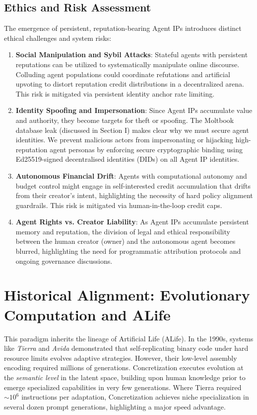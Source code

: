 \documentclass[10pt,journal,compsoc]{IEEEtran}
\begin{document}
\subsection{Ethics and Risk Assessment}
The emergence of persistent, reputation-bearing Agent IPs introduces distinct ethical challenges and system risks:
\begin{enumerate}
    \item \textbf{Social Manipulation and Sybil Attacks}: Stateful agents with persistent reputations can be utilized to systematically manipulate online discourse. Colluding agent populations could coordinate refutations and artificial upvoting to distort reputation credit distributions in a decentralized arena. This risk is mitigated via persistent identity anchor rate limiting.
    \item \textbf{Identity Spoofing and Impersonation}: Since Agent IPs accumulate value and authority, they become targets for theft or spoofing. The Moltbook database leak (discussed in Section I) makes clear why we must secure agent identities. We prevent malicious actors from impersonating or hijacking high-reputation agent personas by enforcing secure cryptographic binding using Ed25519-signed decentralised identities (DIDs) on all Agent IP identities.
    \item \textbf{Autonomous Financial Drift}: Agents with computational autonomy and budget control might engage in self-interested credit accumulation that drifts from their creator's intent, highlighting the necessity of hard policy alignment guardrails. This risk is mitigated via human-in-the-loop credit caps.
    \item \textbf{Agent Rights vs. Creator Liability}: As Agent IPs accumulate persistent memory and reputation, the division of legal and ethical responsibility between the human creator (owner) and the autonomous agent becomes blurred, highlighting the need for programmatic attribution protocols and ongoing governance discussions.
\end{enumerate}

\section{Historical Alignment: Evolutionary Computation and ALife}
This paradigm inherits the lineage of Artificial Life (ALife). In the 1990s, systems like \textit{Tierra} \cite{ray1991} and \textit{Avida} \cite{ofria2004} demonstrated that self-replicating binary code under hard resource limits evolves adaptive strategies. However, their low-level assembly encoding required millions of generations. Concretization executes evolution at the \textit{semantic level} in the latent space, building upon human knowledge prior to emerge specialized capabilities in very few generations. Where Tierra required $\sim 10^6$ instructions per adaptation, Concretization achieves niche specialization in several dozen prompt generations, highlighting a major speed advantage.
\end{document}
